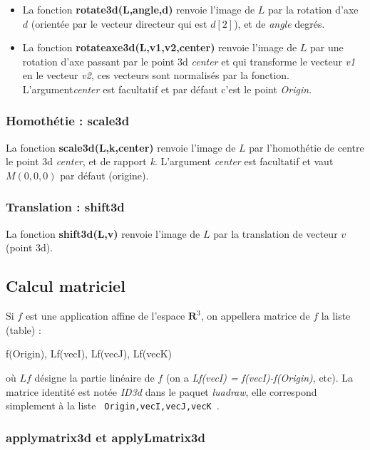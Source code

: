 \begin{itemize}
    \item La fonction \textbf{rotate3d(L,angle,d)} renvoie l'image de $L$ par la rotation d'axe $d$ (orientée par le vecteur directeur qui est $d[2]$), et de \emph{angle} degrés.
    \item La fonction \textbf{rotateaxe3d(L,v1,v2,center)} renvoie l'image de $L$ par une rotation d'axe passant par le point 3d \emph{center} et qui transforme le vecteur \emph{v1} en le vecteur \emph{v2}, ces vecteurs sont normalisés par la fonction. L'argument\emph{center} est facultatif et par défaut c'est le point \emph{Origin}.
\end{itemize}


\subsubsection{Homothétie : scale3d}

La fonction \textbf{scale3d(L,k,center)} renvoie l'image de $L$ par l'homothétie de centre le point 3d \emph{center}, et de rapport \emph{k}. L'argument \emph{center} est facultatif et vaut $M(0,0,0)$ par défaut (origine).

\subsubsection{Translation : shift3d}

La fonction \textbf{shift3d(L,v)} renvoie l'image de $L$ par la translation de vecteur $v$ (point 3d).

\subsection{Calcul matriciel}

Si $f$ est une application affine de l'espace $\mathbf R^3$, on appellera matrice de $f$ la liste (table) :
\begin{Luacode}
{ f(Origin), Lf(vecI), Lf(vecJ), Lf(vecK) }
\end{Luacode}
où $Lf$ désigne la partie linéaire de $f$ (on a \emph{Lf(vecI) = f(vecI)-f(Origin)}, etc). La matrice identité est notée \emph{ID3d} dans le paquet \emph{luadraw}, elle correspond simplement à la liste \texttt{ {Origin,vecI,vecJ,vecK} }.

\subsubsection{applymatrix3d et applyLmatrix3d}


